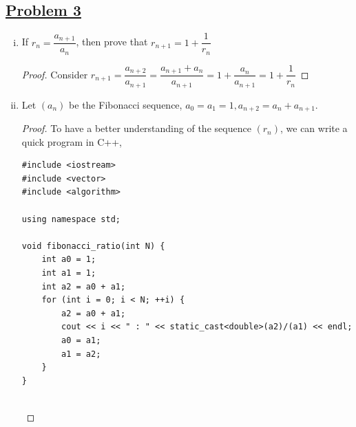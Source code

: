 \documentclass[10pt,letterpaper]{article}
\begin{document}
	\subsection*{{\color{purple}\underline{Problem 3}}}
	\begin{enumerate}[(i)]
		\item If $r_n = \dfrac{a_{n+1}}{a_n}$, then prove that $r_{n+1} = 1 + \dfrac{1}{r_n}$
		\begin{proof}		
		Consider $r_{n+1} = \dfrac{a_{n+2}}{a_{n+1}} 
		= \dfrac{a_{n+1} + a_{n}}{a_{n+1}}
		= 1 + \dfrac{a_{n}}{a_{n+1}}
		= 1 + \dfrac{1}{r_n}$
		\end{proof}
		
		\item Let $(a_n)$ be the Fibonacci sequence, $a_0 = a_1 = 1, a_{n+2} = a_n + a_{n+1}$. 
		\begin{proof}
		To have a better understanding of the sequence $(r_n)$, we can write a quick program
		in C++, \\
\begin{verbatim}
#include <iostream>
#include <vector>
#include <algorithm>

using namespace std;

void fibonacci_ratio(int N) {
	int a0 = 1;
	int a1 = 1;
	int a2 = a0 + a1;
	for (int i = 0; i < N; ++i) {
		a2 = a0 + a1;
		cout << i << " : " << static_cast<double>(a2)/(a1) << endl;
		a0 = a1;
		a1 = a2;
	}
}


\end{verbatim}
\end{proof}
\end{enumerate}
\end{document}
